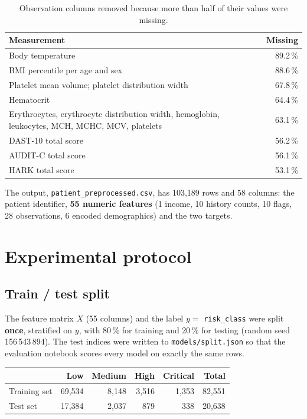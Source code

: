 \documentclass[11pt,a4paper]{article}
\newcommand{\code}[1]{\texttt{\textcolor{codegrey}{#1}}}
\newcommand{\sect}[1]{\section{#1}}
\begin{document}
\begin{table}[H]
\centering\small
\caption{Observation columns removed because more than half of their values were missing.}
\label{tab:dropped}
\begin{tabular}{@{}p{11.5cm}r@{}}
\toprule
\textbf{Measurement} & \textbf{Missing} \\
\midrule
Body temperature & 89.2\,\% \\
BMI percentile per age and sex & 88.6\,\% \\
Platelet mean volume; platelet distribution width & 67.8\,\% \\
Hematocrit & 64.4\,\% \\
Erythrocytes, erythrocyte distribution width, hemoglobin, leukocytes, MCH, MCHC, MCV, platelets & 63.1\,\% \\
DAST-10 total score & 56.2\,\% \\
AUDIT-C total score & 56.1\,\% \\
HARK total score & 53.1\,\% \\
\bottomrule
\end{tabular}
\end{table}

The output, \code{patient\_preprocessed.csv}, has 103{,}189 rows and 58 columns:
the patient identifier, \textbf{55 numeric features} (1 income, 10 history counts, 10 flags,
28 observations, 6 encoded demographics) and the two targets.

\sect{Experimental protocol}

\subsection{Train / test split}

The feature matrix $X$ (55 columns) and the label $y = $ \code{risk\_class} were split
\textbf{once}, stratified on $y$, with 80\,\% for training and 20\,\% for testing
(random seed 156\,543\,894). The test indices were written to \code{models/split.json} so that the
evaluation notebook scores every model on exactly the same rows.

\begin{center}\small
\begin{tabular}{@{}lrrrrr@{}}
\toprule
 & \textbf{Low} & \textbf{Medium} & \textbf{High} & \textbf{Critical} & \textbf{Total} \\
\midrule
Training set & 69{,}534 & 8{,}148 & 3{,}516 & 1{,}353 & 82{,}551 \\
Test set     & 17{,}384 & 2{,}037 &   879 &   338 & 20{,}638 \\
\bottomrule
\end{tabular}
\end{center}
\end{document}
